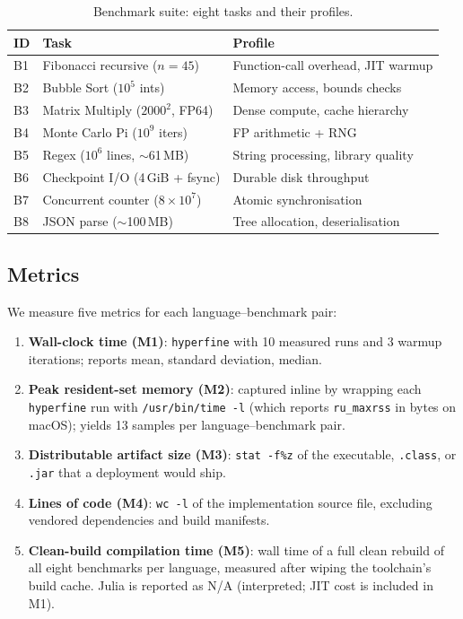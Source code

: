 \documentclass[10pt,conference]{IEEEtran}
\begin{document}
\begin{table}[h]
\caption{Benchmark suite: eight tasks and their profiles.}
\label{tab:benchmarks}
\centering
\small
\begin{tabular}{lll}
\toprule
\textbf{ID} & \textbf{Task} & \textbf{Profile} \\
\midrule
B1 & Fibonacci recursive ($n{=}45$) & Function-call overhead, JIT warmup \\
B2 & Bubble Sort ($10^5$ ints)      & Memory access, bounds checks \\
B3 & Matrix Multiply ($2000^2$, FP64) & Dense compute, cache hierarchy \\
B4 & Monte Carlo Pi ($10^9$ iters)  & FP arithmetic + RNG \\
B5 & Regex ($10^6$ lines, $\sim$61\,MB) & String processing, library quality \\
B6 & Checkpoint I/O (4\,GiB + fsync) & Durable disk throughput \\
B7 & Concurrent counter ($8{\times}10^7$) & Atomic synchronisation \\
B8 & JSON parse ($\sim$100\,MB)     & Tree allocation, deserialisation \\
\bottomrule
\end{tabular}
\end{table}

\subsection{Metrics}

We measure five metrics for each language--benchmark pair:
\begin{enumerate}
    \item \textbf{Wall-clock time (M1)}: \texttt{hyperfine} with 10
          measured runs and 3 warmup iterations; reports mean,
          standard deviation, median.
    \item \textbf{Peak resident-set memory (M2)}: captured inline by
          wrapping each \texttt{hyperfine} run with
          \texttt{/usr/bin/time -l} (which reports
          \texttt{ru\_maxrss} in bytes on macOS); yields 13 samples
          per language--benchmark pair.
    \item \textbf{Distributable artifact size (M3)}: \texttt{stat -f\%z}
          of the executable, \texttt{.class}, or \texttt{.jar} that a
          deployment would ship.
    \item \textbf{Lines of code (M4)}: \texttt{wc -l} of the
          implementation source file, excluding vendored dependencies
          and build manifests.
    \item \textbf{Clean-build compilation time (M5)}: wall time of a
          full clean rebuild of all eight benchmarks per language,
          measured after wiping the toolchain's build cache. Julia is
          reported as N/A (interpreted; JIT cost is included in M1).
\end{enumerate}
\end{document}
